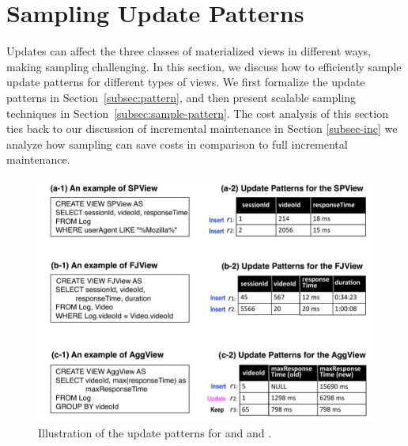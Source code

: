 \section{Sampling Update Patterns}
\label{sampling}
Updates can affect the three classes of materialized views in different ways, making sampling challenging. 
In this section, we discuss how to efficiently sample update patterns for different types of views.
We first formalize the update patterns in Section~\ref{subsec:pattern}, and then present scalable sampling techniques in Section~\ref{subsec:sample-pattern}. 
The cost analysis of this section ties back to our discussion of incremental maintenance in Section \ref{subsec-inc} we analyze how sampling can save costs in comparison to full incremental maintenance.

\begin{figure}[tup]
\centering
\vspace{-0.75em}
 \hspace*{-2em}\includegraphics[scale=0.4]{figs/update-pattern-new.pdf}\vspace{-1em}
 \caption{Illustration of the update patterns for \spview and \fjview and \aggview.}\label{fig:update-pattern}\vspace{-1em}
\end{figure}

